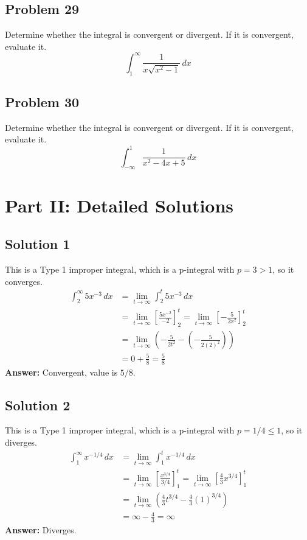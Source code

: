 \documentclass{article}
\begin{document}
\subsection*{Problem 29}
Determine whether the integral is convergent or divergent. If it is convergent, evaluate it.
\[ \int_{1}^{\infty} \frac{1}{x\sqrt{x^2-1}} \,dx \]

\subsection*{Problem 30}
Determine whether the integral is convergent or divergent. If it is convergent, evaluate it.
\[ \int_{-\infty}^{1} \frac{1}{x^2-4x+5} \,dx \]

\newpage

\section*{Part II: Detailed Solutions}

\subsection*{Solution 1}
This is a Type 1 improper integral, which is a p-integral with $p=3 > 1$, so it converges.
\begin{align*}
\int_{2}^{\infty} 5x^{-3} \,dx &= \lim_{t \to \infty} \int_{2}^{t} 5x^{-3} \,dx \\
&= \lim_{t \to \infty} \left[ \frac{5x^{-2}}{-2} \right]_{2}^{t} = \lim_{t \to \infty} \left[ -\frac{5}{2x^2} \right]_{2}^{t} \\
&= \lim_{t \to \infty} \left( -\frac{5}{2t^2} - \left(-\frac{5}{2(2)^2}\right) \right) \\
&= 0 + \frac{5}{8} = \frac{5}{8}
\end{align*}
\textbf{Answer:} Convergent, value is $5/8$.

\subsection*{Solution 2}
This is a Type 1 improper integral, which is a p-integral with $p=1/4 \le 1$, so it diverges.
\begin{align*}
\int_{1}^{\infty} x^{-1/4} \,dx &= \lim_{t \to \infty} \int_{1}^{t} x^{-1/4} \,dx \\
&= \lim_{t \to \infty} \left[ \frac{x^{3/4}}{3/4} \right]_{1}^{t} = \lim_{t \to \infty} \left[ \frac{4}{3}x^{3/4} \right]_{1}^{t} \\
&= \lim_{t \to \infty} \left( \frac{4}{3}t^{3/4} - \frac{4}{3}(1)^{3/4} \right) \\
&= \infty - \frac{4}{3} = \infty
\end{align*}
\textbf{Answer:} Diverges.
\end{document}
